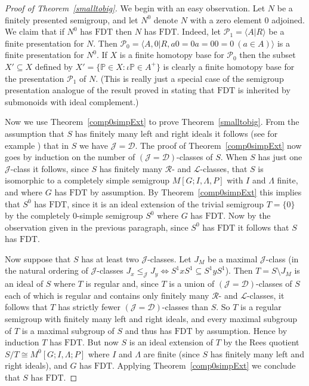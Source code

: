 \documentclass[11pt]{amsart}
\theoremstyle{plain}
\begin{document}
\begin{proof}[Proof of Theorem~\ref{smalltobig}]

We begin with an easy observation. Let $N$ be a finitely presented semigroup, and let $N^0$ denote $N$ with a zero element $0$ adjoined. We claim that if $N^0$ has $\mathrm{FDT}$ then $N$ has $\mathrm{FDT}$. Indeed, let $\mathcal{P}_1 = {\langle} A | R {\rangle}$ be a finite  presentation for $N$. Then $\mathcal{P}_0 = {\langle} A, 0 | R, a0 = 0a = 00 = 0 \ (a \in A) {\rangle}$ is a finite presentation for $N^0$. If $X$ is a finite homotopy base for $\mathcal{P}_0$ then the subset $X' \subseteq X$ defined by
$
X' = \{ {\mathbb{P}} \in X : \iota {\mathbb{P}} \in A^+ \}
$
is clearly a finite homotopy base for the presentation $\mathcal{P}_1$ of $N$. (This is really just a special case of the semigroup presentation analogue of the result proved in \cite{Pride5} stating that $\mathrm{FDT}$ is inherited by submonoids with ideal complement.)

Now we use Theorem~\ref{comp0simpExt} to prove Theorem~\ref{smalltobig}. From the assumption that $S$ has finitely many left and right ideals it follows (see for example \cite[Chapter~6]{CliffordAndPreston}) that in $S$ we have ${\mathcal{J}} = {\mathcal{D}}$. The proof of Theorem~\ref{comp0simpExt} now goes by induction on the number of $({\mathcal{J}} = {\mathcal{D}})$-classes of $S$. When $S$ has just one ${\mathcal{J}}$-class it follows, since $S$ has finitely many ${\mathcal{R}}$- and ${\mathcal{L}}$-classes, that $S$ is isomorphic to a completely simple semigroup $M[G;I,\Lambda,P]$ with $I$ and $\Lambda$ finite, and where $G$ has $\mathrm{FDT}$ by assumption. By Theorem~\ref{comp0simpExt} this implies that $S^0$ has $\mathrm{FDT}$, since it is an ideal extension of the trivial semigroup $T = \{ 0 \}$ by the completely $0$-simple semigroup $S^0$ where $G$ has $\mathrm{FDT}$. Now by the observation given in the previous paragraph, since $S^0$ has $\mathrm{FDT}$ it follows that $S$ has $\mathrm{FDT}$.

Now suppose that $S$ has at least two ${\mathcal{J}}$-classes. Let $J_M$ be a maximal ${\mathcal{J}}$-class (in the natural ordering of ${\mathcal{J}}$-classes $J_x \leq_{\mathcal{J}} J_y \Leftrightarrow S^1 x S^1 \subseteq S^1 y S^1$). Then $T = S \setminus J_M$ is an ideal of $S$ where $T$ is regular and, since $T$ is a union of $({\mathcal{J}} = {\mathcal{D}})$-classes of $S$ each of which is regular and contains only finitely many ${\mathcal{R}}$- and ${\mathcal{L}}$-classes, it follows that  
$T$ has strictly fewer $({\mathcal{J}} = {\mathcal{D}})$-classes than $S$. So $T$ is a regular semigroup with finitely many left and right ideals, and every maximal subgroup of $T$ is a maximal subgroup of $S$ and thus has $\mathrm{FDT}$ by assumption. Hence by induction $T$ has $\mathrm{FDT}$. But now $S$ is an ideal extension of $T$ by the Rees quotient $S / T \cong M^0[G;I,\Lambda;P]$ where $I$ and $\Lambda$ are finite (since $S$ has finitely many left and right ideals), and $G$  has $\mathrm{FDT}$. Applying Theorem~\ref{comp0simpExt} we conclude that $S$ has $\mathrm{FDT}$.
\end{proof}
\end{document}

